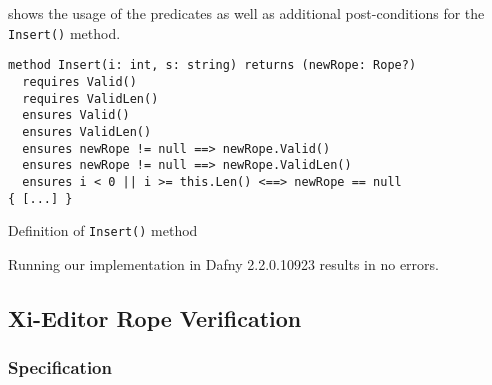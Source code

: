  shows the usage of the predicates as well as additional post-conditions for the \texttt{Insert()} method.

\begin{listing}[h!]
\begin{verbatim}
method Insert(i: int, s: string) returns (newRope: Rope?)
  requires Valid()
  requires ValidLen()
  ensures Valid()
  ensures ValidLen()
  ensures newRope != null ==> newRope.Valid()
  ensures newRope != null ==> newRope.ValidLen()
  ensures i < 0 || i >= this.Len() <==> newRope == null
{ [...] }
\end{verbatim}
    \caption{Definition of \texttt{Insert()} method}
    \label{lst:insert}
\end{listing}

Running our implementation in Dafny 2.2.0.10923 results in no errors.



\subsection{Xi-Editor Rope Verification}

\subsubsection{Specification}